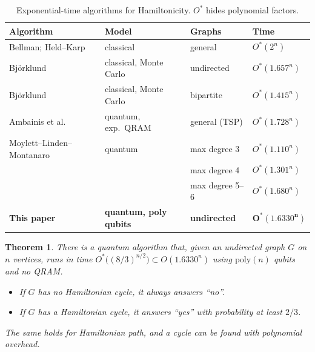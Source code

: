\documentclass[11pt,a4paper]{article}
\theoremstyle{plain}
\newtheorem{theorem}{Theorem}
\newtheorem{corollary}[theorem]{Corollary}
\theoremstyle{remark}
\newcommand{\Ostar}{O^{*}}
\begin{document}
\begin{table}[t]
\centering
\small
\begin{tabular}{@{}llll@{}}
\toprule
Algorithm & Model & Graphs & Time \\
\midrule
Bellman; Held--Karp~\cite{bellman,heldkarp} & classical & general & $\Ostar(2^n)$ \\
Björklund~\cite{bjorklund} & classical, Monte Carlo & undirected & $\Ostar(1.657^n)$ \\
Björklund~\cite{bjorklund} & classical, Monte Carlo & bipartite & $\Ostar(1.415^n)$ \\
Ambainis et al.~\cite{ambainis} & quantum, exp.\ QRAM & general (TSP) & $\Ostar(1.728^n)$ \\
Moylett--Linden--Montanaro~\cite{mlm} & quantum & max degree 3 & $\Ostar(1.110^n)$ \\
 & & max degree 4 & $\Ostar(1.301^n)$ \\
 & & max degree 5--6 & $\Ostar(1.680^n)$ \\
\textbf{This paper} & \textbf{quantum, poly qubits} & \textbf{undirected} & $\boldsymbol{\Ostar(1.6330^n)}$ \\
\bottomrule
\end{tabular}
\caption{Exponential-time algorithms for Hamiltonicity. $\Ostar$ hides polynomial factors.}
\label{tab:results}
\end{table}

\begin{mainresult}
\begin{theorem}\label{thm:main}
There is a quantum algorithm that, given an undirected graph $G$ on $n$ vertices, runs in time $\Ostar\big((8/3)^{n/2}\big) \subset O(1.6330^n)$ using $\mathrm{poly}(n)$ qubits and no QRAM.
\begin{itemize}[nosep,leftmargin=1.5em]
  \item If $G$ has no Hamiltonian cycle, it always answers ``no''.
  \item If $G$ has a Hamiltonian cycle, it answers ``yes'' with probability at least $2/3$.
\end{itemize}
The same holds for Hamiltonian path, and a cycle can be found with polynomial overhead.
\end{theorem}
\end{mainresult}
\end{document}
